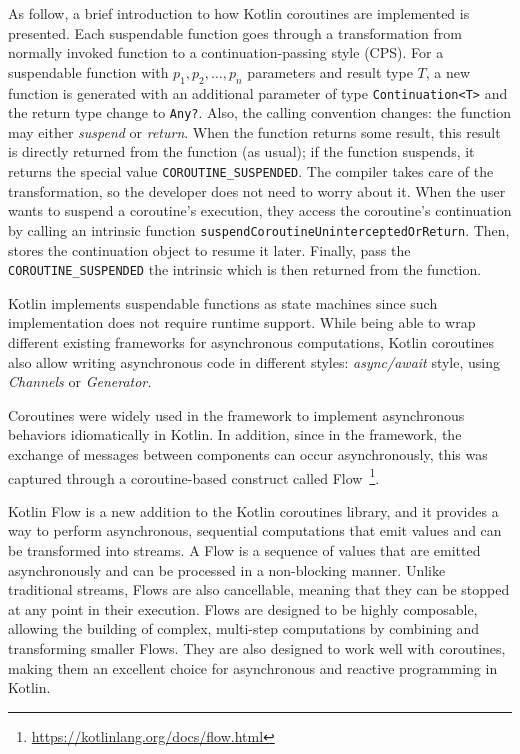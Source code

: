 As follow, a brief introduction to how Kotlin coroutines are implemented is presented.
Each suspendable function goes through a transformation from normally invoked function to a continuation-passing style (CPS).
For a suspendable function with $p_1, p_2, \dots, p_n$ parameters and result type $T$, a new function is generated with an additional parameter of
type \texttt{Continuation<T>} and the return type change to \texttt{Any?}.
Also, the calling convention changes: the function may either \emph{suspend} or \emph{return}. When the function returns some result, this result is
directly returned from the function (as usual); if the function suspends, it returns the special value \texttt{COROUTINE\_SUSPENDED}.
The compiler takes care of the transformation, so the developer does not need to worry about it. When the user wants to suspend a coroutine's
execution, they access the coroutine's continuation by calling an intrinsic function \texttt{suspendCoroutineUninterceptedOrReturn}. Then, stores the
continuation object to resume it later. Finally, pass the \texttt{COROUTINE\_SUSPENDED} the intrinsic which is then returned from the function.

Kotlin implements suspendable functions as state machines since such implementation does not require runtime support.
While being able to wrap different existing frameworks for asynchronous computations, Kotlin coroutines also allow writing asynchronous code in
different styles: \emph{async/await} style, using \emph{Channels} or \emph{Generator.}

Coroutines were widely used in the framework to implement asynchronous behaviors idiomatically in Kotlin. In addition, since in the framework, the
exchange of messages between components can occur asynchronously, this was captured through a coroutine-based construct called
Flow~\footnote{\url{https://kotlinlang.org/docs/flow.html}}.

Kotlin Flow is a new addition to the Kotlin coroutines library, and it provides a way to perform asynchronous, sequential computations that emit
values and can be transformed into streams. A Flow is a sequence of values that are emitted asynchronously and can be processed in a non-blocking
manner. Unlike traditional streams, Flows are also cancellable, meaning that they can be stopped at any point in their execution. Flows are designed
to be highly composable, allowing the building of complex, multi-step computations by combining and transforming smaller Flows. They are also
designed to work well with coroutines, making them an excellent choice for asynchronous and reactive programming in Kotlin.

